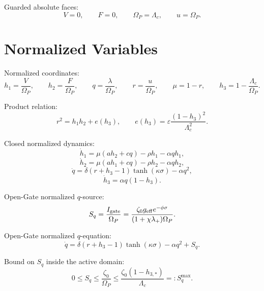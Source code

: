 \documentclass[11pt,a4paper]{article}
\newcommand{\Igate}{I_{\rm gate}}
\newcommand{\Sq}{S_q}
\newcommand{\Om}{\Omega_P}
\theoremstyle{plain}
\theoremstyle{definition}
\theoremstyle{remark}
\begin{document}
Guarded absolute faces:
\begin{equation}
  V=0,
  \qquad
  F=0,
  \qquad
  \Om=\Lambda_c,
  \qquad
  u=\Om.
\end{equation}

\section{Normalized Variables}

Normalized coordinates:
\begin{equation}
  h_1=\frac{V}{\Om},
  \qquad
  h_2=\frac{F}{\Om},
  \qquad
  q=\frac{\lambda}{\Om},
  \qquad
  r=\frac{u}{\Om},
  \qquad
  \mu=1-r,
  \qquad
  h_3=1-\frac{\Lambda_c}{\Om}.
\end{equation}

Product relation:
\begin{equation}
  r^2=h_1h_2+e(h_3),
  \qquad
  e(h_3)=\varepsilon\frac{(1-h_3)^2}{\Lambda_c^2}.
\end{equation}

Closed normalized dynamics:
\begin{equation}
  \dot h_1=\mu(ah_2+cq)-\rho h_1-\alpha qh_1,
\end{equation}
\begin{equation}
  \dot h_2=\mu(ah_1+cq)-\rho h_2-\alpha qh_2,
\end{equation}
\begin{equation}
  \dot q=\delta(r+h_3-1)\tanh(\kappa\sigma)-\alpha q^2,
\end{equation}
\begin{equation}
  \dot h_3=\alpha q(1-h_3).
\end{equation}

Open-Gate normalized $q$-source:
\begin{equation}
  \Sq=\frac{\Igate}{\Om}
  =\frac{\zeta_0g_{\rm eff}e^{-\phi\sigma}}
  {(1+\chi\lambda_+)\Om}.
\end{equation}

Open-Gate normalized $q$-equation:
\begin{equation}
  \dot q=\delta(r+h_3-1)\tanh(\kappa\sigma)-\alpha q^2+\Sq.
\end{equation}

Bound on $S_q$ inside the active domain:
\begin{equation}
  0\le \Sq\le \frac{\zeta_0}{\Om}
  \le \frac{\zeta_0(1-h_{3,*})}{\Lambda_c}
  =:S_q^{\max}.
\end{equation}
\end{document}
